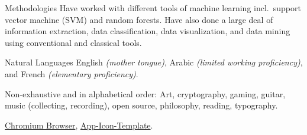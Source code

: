 \documentclass[10pt,a4paper]{article}
\begin{document}
\inlineheadsection 
{Methodologies}
{Have worked with different tools of machine learning incl.\ support vector machine (SVM) and random forests. Have also done a large deal of information extraction, data classification, data visualization, and data mining using conventional and classical tools.}

\inlineheadsection 
{Natural Languages}
{English \textit{(mother tongue)}, Arabic \textit{(limited working proficiency)}, and French \textit{(elementary proficiency)}.}


\spacedhrule{1.6em}{-0.4em} %



\inlineheadsection %
{Non-exhaustive and in alphabetical order:}
{Art, cryptography, gaming, guitar, music (collecting, recording), open source, philosophy, reading, typography.}


\spacedhrule{1.6em}{-0.4em} %



{\href{http://www.chromium.org}{Chromium Browser}, \href{https://github.com/theherk/App-Icon-Template}{App-Icon-Template}.}

\end{document}
